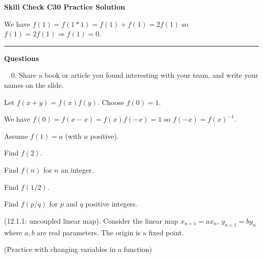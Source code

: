 \documentclass[12pt,letterpaper,noanswers]{exam}
\begin{document}
\noindent\textbf{Skill Check C30 Practice Solution}

We have $f(1) = f(1*1) = f(1)+f(1) = 2f(1)$ so $f(1) = 2f(1) \Rightarrow f(1) = 0$.


\vspace{0.2cm}

\hrule
\vspace{0.2cm}


\noindent\textbf{Questions}

\noindent \ \ 0.  Share a book or article you found interesting with your team, and write your names on the slide.

\begin{questions}
 \question Let $f(x+y) = f(x)f(y)$.  Choose $f(0) = 1$. 

We have $f(0)=f(x-x) = f(x)f(-x) = 1$ so $f(-x) = f(x)^{-1}$.

Assume $f(1) = a$ (with $a$ positive).



\begin{parts}
\item Find $f(2)$.
\item Find $f(n)$ for $n$ an integer.
\item Find $f(1/2)$.
\item Find $f(p/q)$ for $p$ and $q$ positive integers.
\end{parts}

\question (12.1.1: uncoupled linear map).  Consider the linear map $x_{n+1} = ax_n$, $y_{n+1} = by_n$ where $a, b$ are real parameters.  The origin is a fixed point.


\question (Practice with changing variables in a function) 


\end{questions}
\end{document}
